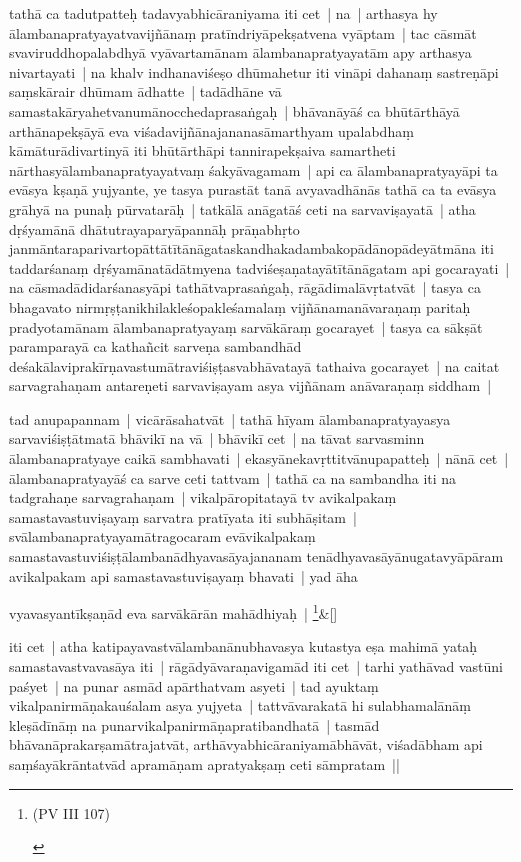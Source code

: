 \documentclass[article,12pt,a4paper]{memoir}
\begin{document}
	  \pstart tathā ca tadutpatteḥ tadavyabhicāraniyama iti cet | na | arthasya hy ālambanapratyayatvavijñānaṃ pratīndriyāpekṣatvena vyāptam | tac cāsmāt svaviruddhopalabdhyā vyāvartamānam ālambanapratyayatām apy arthasya nivartayati | na khalv indhanaviśeṣo dhūmahetur iti vināpi dahanaṃ sastreṇāpi saṃskārair dhūmam ādhatte | tadādhāne vā samastakāryahetvanumānocchedaprasaṅgaḥ | bhāvanāyāś ca bhūtārthāyā arthānapekṣāyā eva viśadavijñānajananasāmarthyam upalabdhaṃ kāmāturādivartinyā iti bhūtārthāpi tannirapekṣaiva samartheti nārthasyālambanapratyayatvaṃ śakyāvagamam | api ca ālambanapratyayāpi ta evāsya kṣaṇā yujyante, ye tasya purastāt tanā avyavadhānās tathā ca ta evāsya grāhyā na punaḥ pūrvatarāḥ | tatkālā anāgatāś ceti na sarvaviṣayatā | atha dṛśyamānā dhātutrayaparyāpannāḥ prāṇabhṛto janmāntaraparivartopāttātītānāgataskandhakadambakopādānopādeyātmāna iti taddarśanaṃ dṛśyamānatādātmyena tadviśeṣaṇatayātītānāgatam api gocarayati | na cāsmadādidarśanasyāpi tathātvaprasaṅgaḥ, rāgādimalāvṛtatvāt | tasya ca bhagavato nirmṛṣṭanikhilakleśopakleśamalaṃ vijñānamanāvaraṇaṃ paritaḥ pradyotamānam ālambanapratyayaṃ sarvākāraṃ gocarayet | tasya ca sākṣāt paramparayā ca kathañcit sarveṇa sambandhād deśakālaviprakīrṇavastumātraviśiṣṭasvabhāvatayā tathaiva gocarayet | na caitat sarvagrahaṇam antareṇeti sarvaviṣayam asya vijñānam anāvaraṇaṃ siddham | 
	\pend
      

	  \pstart tad anupapannam | vicārāsahatvāt | tathā hīyam ālambanapratyayasya sarvaviśiṣṭātmatā bhāvikī na vā | bhāvikī cet | na tāvat sarvasminn ālambanapratyaye caikā sambhavati | ekasyānekavṛttitvānupapatteḥ | nānā cet | ālambanapratyayāś ca sarve ceti tattvam | tathā ca na sambandha iti na tadgrahaṇe sarvagrahaṇam | vikalpāropitatayā tv avikalpakaṃ samastavastuviṣayaṃ sarvatra pratīyata iti subhāṣitam | svālambanapratyayamātragocaram evāvikalpakaṃ samastavastuviśiṣṭālambanādhyavasāyajananam tenādhyavasāyānugatavyāpāram avikalpakam api samastavastuviṣayaṃ bhavati | yad āha 
	\pend
      
	    
	    \stanza[\smallbreak]
	vyavasyantīkṣaṇād eva sarvākārān mahādhiyaḥ | \footnote{\begin{english}(PV III 107)\end{english}}\&[\smallbreak]


	

	  \pstart iti cet | atha katipayavastvālambanānubhavasya kutastya eṣa mahimā yataḥ samastavastvavasāya iti | rāgādyāvaraṇavigamād iti cet | tarhi yathāvad vastūni paśyet | na punar asmād apārthatvam asyeti | tad ayuktaṃ vikalpanirmāṇakauśalam asya yujyeta | tattvāvarakatā hi sulabhamalānāṃ kleṣādīnāṃ na punarvikalpanirmāṇapratibandhatā | tasmād bhāvanāprakarṣamātrajatvāt, arthāvyabhicāraniyamābhāvāt, viśadābham api saṃśayākrāntatvād apramāṇam apratyakṣaṃ ceti sāmpratam || 
	\pend
      
\end{document}
